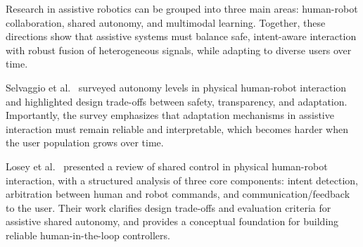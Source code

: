 \documentclass[3p,times,procedia]{elsarticle}
\begin{document}

Research in assistive robotics can be grouped into three main areas: human-robot collaboration, shared autonomy, and multimodal learning. Together, these directions show that assistive systems must balance safe, intent-aware interaction with robust fusion of heterogeneous signals, while adapting to diverse users over time. 



Selvaggio et al.~\cite{selvaggio2021autonomy} surveyed autonomy levels in physical human-robot interaction and highlighted design trade-offs between safety, transparency, and adaptation. Importantly, the survey emphasizes that adaptation mechanisms in assistive interaction must remain reliable and interpretable, which becomes harder when the user population grows over time.

Losey et al.~\cite{losey2018assistive} presented a review of shared control in physical human-robot interaction, with a structured analysis of three core components: intent detection, arbitration between human and robot commands, and communication/feedback to the user. Their work clarifies design trade-offs and evaluation criteria for assistive shared autonomy, and provides a conceptual foundation for building reliable human-in-the-loop controllers. %
\end{document}

